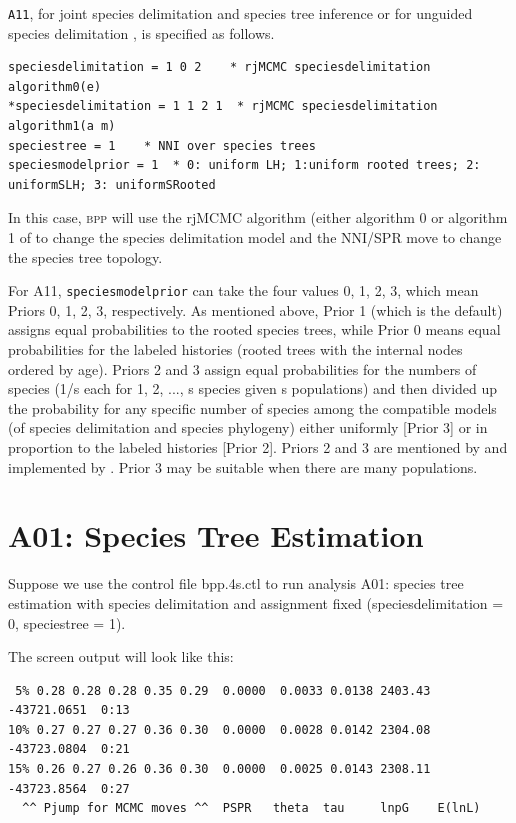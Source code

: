 \documentclass[a4paper]{book}
\numberwithin{equation}{section} \renewcommand{\baselinestretch}{0.55}
\begin{document}
\texttt{A11}, for joint species delimitation and species tree
inference or for unguided species delimitation \cite{Yang2014a}, is
specified as follows.
\begin{verbatim}
speciesdelimitation = 1 0 2    * rjMCMC speciesdelimitation algorithm0(e)
*speciesdelimitation = 1 1 2 1  * rjMCMC speciesdelimitation algorithm1(a m)
speciestree = 1    * NNI over species trees
speciesmodelprior = 1  * 0: uniform LH; 1:uniform rooted trees; 2: uniformSLH; 3: uniformSRooted
\end{verbatim}

In this case, \textsc{bpp} will use the rjMCMC algorithm (either
algorithm 0 or algorithm 1 of \cite{Yang2010} to change the species
delimitation model and the NNI/SPR move to change the species tree
topology.

For A11, \texttt{speciesmodelprior} can take the four values 0, 1, 2,
3, which mean Priors 0, 1, 2, 3, respectively.  As mentioned above,
Prior 1 (which is the default) assigns equal probabilities to the
rooted species trees, while Prior 0 means equal probabilities for the
labeled histories (rooted trees with the internal nodes ordered by
age).  Priors 2 and 3 assign equal probabilities for the numbers of
species (1/s each for 1, 2, ..., s species given s populations) and
then divided up the probability for any specific number of species
among the compatible models (of species delimitation and species
phylogeny) either uniformly [Prior 3] or in proportion to the labeled
histories [Prior 2].  Priors 2 and 3 are mentioned by \cite{Yang2014a}
and implemented by \cite{Yang2015}.  Prior 3 may be suitable when
there are many populations.





\section{A01: Species Tree Estimation}

Suppose we use the control file bpp.4s.ctl to run analysis A01:
species tree estimation with species delimitation and assignment fixed
(speciesdelimitation = 0, speciestree = 1).

The screen output will look like this:

\begin{verbatim}
 5% 0.28 0.28 0.28 0.35 0.29  0.0000  0.0033 0.0138 2403.43 -43721.0651  0:13
10% 0.27 0.27 0.27 0.36 0.30  0.0000  0.0028 0.0142 2304.08 -43723.0804  0:21
15% 0.26 0.27 0.26 0.36 0.30  0.0000  0.0025 0.0143 2308.11 -43723.8564  0:27
  ^^ Pjump for MCMC moves ^^  PSPR   theta  tau     lnpG    E(lnL)
\end{verbatim}
\end{document}
